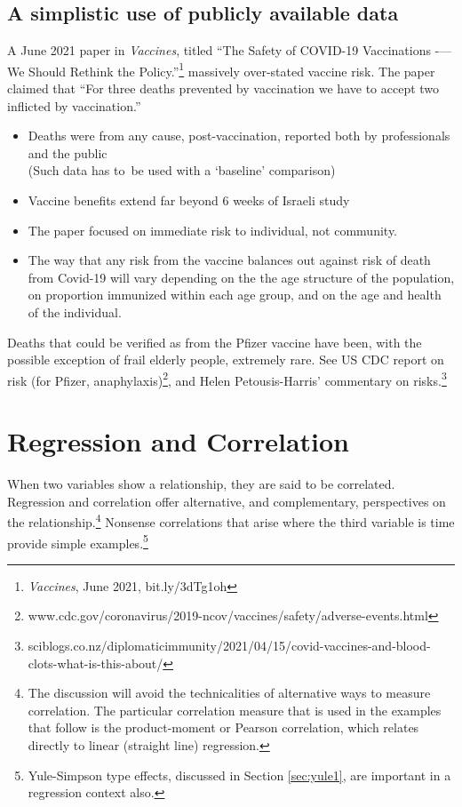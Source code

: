 \documentclass[
  10ptls,
  b5paper]{book}
\providecommand{\tightlist}{%
  \setlength{\itemsep}{0pt}\setlength{\parskip}{0pt}}
\begin{document}
\hypertarget{a-simplistic-use-of-publicly-available-data}{%
\section{A simplistic use of publicly available data}\label{a-simplistic-use-of-publicly-available-data}}

A June 2021 paper in \emph{Vaccines}, titled
``The Safety of COVID-19 Vaccinations -\/--- We Should Rethink the Policy.''\footnote{\emph{Vaccines}, June 2021, bit.ly/3dTg1oh}
massively over-stated vaccine risk. The paper claimed that
``For three deaths prevented by vaccination we have to accept
two inflicted by vaccination.''

\begin{itemize}
\tightlist
\item
  Deaths were from any cause, post-vaccination, reported both by
  professionals and the public\\
  (Such data has to~be used with a `baseline' comparison)
\item
  Vaccine benefits extend far beyond 6 weeks of Israeli study
\item
  The paper focused on immediate risk to individual, not community.
\item
  The way that any risk from the vaccine balances out against
  risk of death from Covid-19 will vary depending on the the age
  structure of the population, on proportion immunized within
  each age group, and on the age and health of the individual.
\end{itemize}

Deaths that could be verified as from the Pfizer vaccine have been,
with the possible exception of frail elderly people, extremely rare.
See US CDC report on risk (for Pfizer, anaphylaxis)\footnote{www.cdc.gov/coronavirus/2019-ncov/vaccines/safety/adverse-events.html},
and Helen Petousis-Harris' commentary on risks.\footnote{sciblogs.co.nz/diplomaticimmunity/2021/04/15/covid-vaccines-and-blood-clots-what-is-this-about/}

\hypertarget{sec:reg}{%
\chapter{Regression and Correlation}\label{sec:reg}}

When two variables show a relationship, they are said to be correlated. Regression and correlation offer alternative, and complementary, perspectives on the relationship.\footnote{The discussion will avoid the technicalities of alternative ways to measure correlation. The particular correlation measure that is used in the examples that follow is the product-moment or Pearson correlation, which relates directly to linear (straight line) regression.} Nonsense correlations that arise where the third variable is time provide simple examples.\footnote{Yule-Simpson type effects, discussed in Section \ref{sec:yule1}, are important in a regression context also.}
\end{document}
